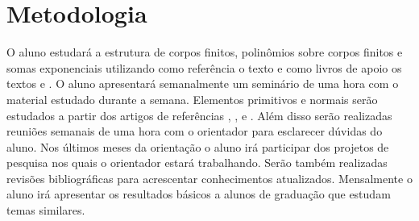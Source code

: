 \documentclass[12pt,twoside]{article}
\begin{document}

  \section*{Metodologia}
    O aluno estudará a estrutura de corpos finitos, polinômios sobre corpos finitos e somas
    exponenciais utilizando como referência o texto \cite[Finite fields]{finite-fields-1997} e como livros 
    de apoio os textos \cite[Abstract algebra]{abstract-algebra-2007} e \cite[Tópicos de álgebra]{topicos-de-algebra-1970}. 
    O aluno apresentará semanalmente um seminário de uma hora com o material estudado durante a semana.
    Elementos primitivos e normais serão estudados a partir dos artigos de referências \cite{article-1987}, 
    \cite{article-2014}, \cite{article-2017} e \cite{article-2018}.
    Além disso serão realizadas reuniões semanais de uma hora com o orientador para esclarecer dúvidas
    do aluno. Nos últimos meses da orientação o aluno irá participar dos projetos de pesquisa nos quais
    o orientador estará trabalhando. Serão também realizadas revisões bibliográficas para acrescentar
    conhecimentos atualizados. Mensalmente o aluno irá apresentar os resultados básicos a alunos de
    graduação que estudam temas similares. \\
    

\end{document}
